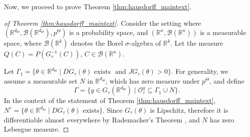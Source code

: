 \documentclass{amsart}
\begin{document}
Now, we proceed to prove Theorem \ref{thm:hausdorff_maintext}.


\begin{proof}[of Theorem \ref{thm:hausdorff_maintext}]

Consider the setting where $(\mathbb{R}^{d_{\Theta}},\mathbb{\mathcal{B}}(\mathbb{R}^{d_{\Theta}}),p^{\Theta})$
is a probability space, and $(\mathbb{R}^{n},\mathcal{B}(\mathbb{R}^{n}))$
is a measurable space, where $\mathcal{B}(\mathbb{R}^{k})$ denotes the Borel $\sigma$-algebra
of $\mathbb{R}^{k}$. Let the measure $Q(C)=P(G_{\tau}^{-1}(C))$, $C\in\mathcal{B}(\mathbb{R}^{n})$. 

Let $\Gamma_1=\{\theta \in \mathbb{R}^{d_{\Theta}} \mid D G_\tau(\theta) \text{ exists } \text{ and } JG_\tau(\theta)>0 \}$. For generality, we assume a measurable set $N$ in $\mathbb{R}^{d_{\Theta}}$, which has zero measure under $p^{\Theta}$, and define 
$$\Gamma = \{y \in G_\tau(\mathbb{R}^{d_\Theta}) \mid \mathcal{O}_\tau^y \subseteq \Gamma_1 \cup N\}.$$In the context of the statement of Theorem \ref{thm:hausdorff_maintext},  $N^c=\{\theta \in \mathbb{R}^{d_\Theta} \mid D G_\tau(\theta) \text{ exists}\}$. Since $G_\tau(\theta)$ is Lipschitz, therefore it is differentiable almost everywhere by Rademacher's Theorem \citep{coarea-diaconis}, and $N$ has zero Lebesgue measure.


\end{proof}
\end{document}

